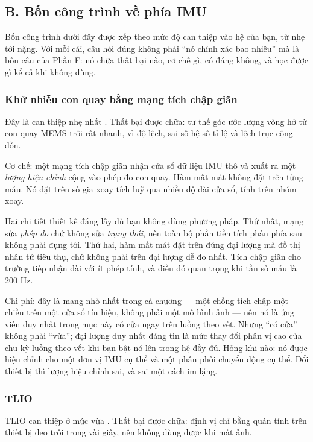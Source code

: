 \documentclass[../../deep_learning.tex]{subfiles}
\begin{document}
\subsection{B. Bốn công trình về phía IMU}

Bốn công trình dưới đây được xếp theo mức độ can thiệp vào hệ của bạn, từ nhẹ tới nặng. Với mỗi cái, câu hỏi đúng không phải ``nó chính xác bao nhiêu'' mà là bốn câu của Phần F: nó chữa thất bại nào, cơ chế gì, có đáng không, và học được gì kể cả khi không dùng.

\subsubsection{Khử nhiễu con quay bằng mạng tích chập giãn}

Đây là can thiệp nhẹ nhất \cite{brossard2020denoising}. Thất bại được chữa: tư thế góc ước lượng vòng hở từ con quay MEMS trôi rất nhanh, vì độ lệch, sai số hệ số tỉ lệ và lệch trục cộng dồn.

Cơ chế: một mạng tích chập giãn nhận cửa sổ dữ liệu IMU thô và xuất ra một \emph{lượng hiệu chỉnh} cộng vào phép đo con quay. Hàm mất mát không đặt trên từng mẫu. Nó đặt trên số gia xoay tích luỹ qua nhiều độ dài cửa sổ, tính trên nhóm xoay.

Hai chi tiết thiết kế đáng lấy dù bạn không dùng phương pháp. Thứ nhất, mạng sửa \emph{phép đo} chứ không sửa \emph{trạng thái}, nên toàn bộ phần tiền tích phân phía sau không phải đụng tới. Thứ hai, hàm mất mát đặt trên đúng đại lượng mà đồ thị nhân tử tiêu thụ, chứ không phải trên đại lượng dễ đo nhất. Tích chập giãn cho trường tiếp nhận dài với ít phép tính, và điều đó quan trọng khi tần số mẫu là 200 Hz.

Chi phí: đây là mạng nhỏ nhất trong cả chương --- một chồng tích chập một chiều trên một cửa sổ tín hiệu, không phải một mô hình ảnh --- nên nó là ứng viên duy nhất trong mục này có cửa ngay trên luồng theo vết. Nhưng ``có cửa'' không phải ``vừa''; đại lượng duy nhất đáng tin là mức thay đổi phân vị cao của chu kỳ luồng theo vết khi bạn bật nó lên trong hệ đầy đủ. Hỏng khi nào: nó được hiệu chỉnh cho một đơn vị IMU cụ thể và một phân phối chuyển động cụ thể. Đổi thiết bị thì lượng hiệu chỉnh sai, và sai một cách im lặng.

\subsubsection{TLIO}

TLIO can thiệp ở mức vừa \cite{liu2020tlio}. Thất bại được chữa: định vị chỉ bằng quán tính trên thiết bị đeo trôi trong vài giây, nên không dùng được khi mất ảnh.
\end{document}

